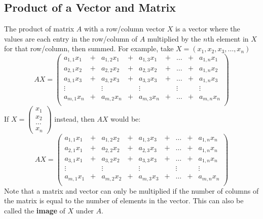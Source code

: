 \documentclass[a4paper]{article}
\begin{document}
  \subsection{Product of a Vector and Matrix}
  The product of matrix $A$ with a row/column vector $X$ is a vector where the values are each entry in the row/column of $A$ multiplied by the $n$th element in $X$ for that row/column, then summed. For example, take $X = (x_1,x_2,x_3,\dots,x_n)$
  \[
    AX = \begin{pmatrix}
      a_{1,1}x_{1} &+& a_{1,2}x_{1} &+& a_{1,3}x_{1} &+& \dots &+& a_{1,n}x_{1}\\
      a_{2,1}x_{2} &+& a_{2,2}x_{2} &+& a_{2,3}x_{2} &+& \dots &+& a_{1,n}x_{2}\\
      a_{3,1}x_{3} &+& a_{3,2}x_{3} &+& a_{3,3}x_{3} &+& \dots &+& a_{1,n}x_{3}\\
      \vdots & \ & \vdots & \ & \vdots & \ & \vdots & \ & \vdots \\
      a_{m,1}x_{n} &+& a_{m,2}x_{n} &+& a_{m,3}x_{n} &+& \dots &+& a_{m,n}x_{n}\\
    \end{pmatrix}
  \]
  If $X = (\begin{smallmatrix} x_1 \\ x_2 \\ \dots \\ x_n  \end{smallmatrix})$ instead, then $AX$ would be:
  \[
    AX = \begin{pmatrix}
      a_{1,1}x_{1} &+& a_{1,2}x_{2} &+& a_{1,3}x_{3} &+& \dots &+& a_{1,n}x_{n}\\
      a_{2,1}x_{1} &+& a_{2,2}x_{2} &+& a_{2,3}x_{3} &+& \dots &+& a_{1,n}x_{n}\\
      a_{3,1}x_{1} &+& a_{3,2}x_{2} &+& a_{3,3}x_{3} &+& \dots &+& a_{1,n}x_{n}\\
      \vdots & \ & \vdots & \ & \vdots & \ & \vdots & \ & \vdots \\
      a_{m,1}x_{1} &+& a_{m,2}x_{2} &+& a_{m,3}x_{3} &+& \dots &+& a_{m,n}x_{n}\\
    \end{pmatrix}
  \]
  Note that a matrix and vector can only be multiplied if the number of columns of the matrix is equal to the number of elements in the vector. This can also be called the \textbf{image} of $X$ under $A$.
\end{document}
